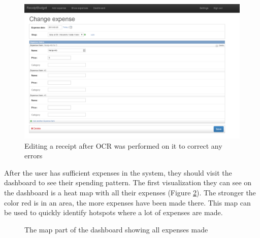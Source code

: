 \begin{figure}[htdp]
\begin{center}
\includegraphics[width=\linewidth]{img/manual/edit_expense.png}
\caption{\label{fig:edit_expense}
Editing a receipt after OCR was performed on it to correct any errors}
\end{center}
\end{figure}

After the user has sufficient expenses in the system, they should visit the dashboard to see their spending pattern. The first visualization they can see on the dashboard is a heat map with all their expenses (Figure \ref{fig:all_map}). The stronger the color red is in an area, the more expenses have been made there. This map can be used to quickly identify hotspots where a lot of expenses are made.

\begin{figure}[htdp]
\begin{center}
\caption{\label{fig:all_map}
The map part of the dashboard showing all expenses made}
\end{center}
\end{figure}

